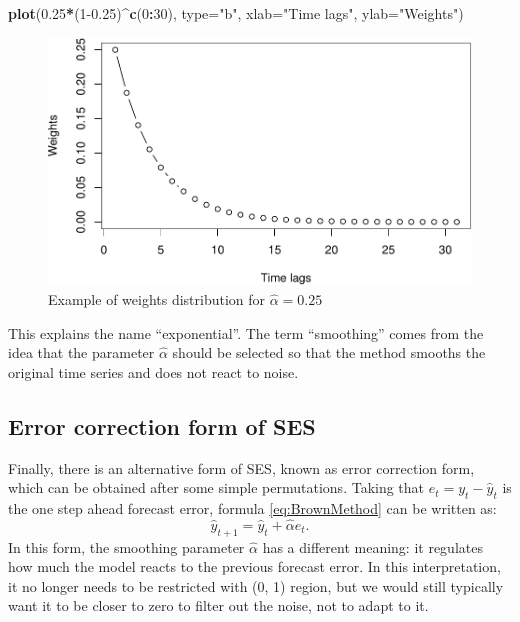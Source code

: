 \documentclass[]{book}
\newenvironment{Shaded}{\begin{snugshade}}{\end{snugshade}}
\newcommand{\DataTypeTok}[1]{\textcolor[rgb]{0.13,0.29,0.53}{#1}}
\newcommand{\DecValTok}[1]{\textcolor[rgb]{0.00,0.00,0.81}{#1}}
\newcommand{\FloatTok}[1]{\textcolor[rgb]{0.00,0.00,0.81}{#1}}
\newcommand{\KeywordTok}[1]{\textcolor[rgb]{0.13,0.29,0.53}{\textbf{#1}}}
\newcommand{\NormalTok}[1]{#1}
\newcommand{\OperatorTok}[1]{\textcolor[rgb]{0.81,0.36,0.00}{\textbf{#1}}}
\newcommand{\StringTok}[1]{\textcolor[rgb]{0.31,0.60,0.02}{#1}}
\theoremstyle{definition}
\theoremstyle{definition}
\theoremstyle{definition}
\theoremstyle{definition}
\theoremstyle{remark}
\begin{document}
\begin{Shaded}
\begin{Highlighting}[]
\KeywordTok{plot}\NormalTok{(}\FloatTok{0.25}\OperatorTok{*}\NormalTok{(}\DecValTok{1}\FloatTok{-0.25}\NormalTok{)}\OperatorTok{^}\KeywordTok{c}\NormalTok{(}\DecValTok{0}\OperatorTok{:}\DecValTok{30}\NormalTok{), }\DataTypeTok{type=}\StringTok{"b"}\NormalTok{, }
     \DataTypeTok{xlab=}\StringTok{"Time lags"}\NormalTok{, }\DataTypeTok{ylab=}\StringTok{"Weights"}\NormalTok{)}
\end{Highlighting}
\end{Shaded}

\begin{figure}
\centering
\includegraphics{Svetunkov--2022----ADAM_files/figure-latex/BrownExponentialExample-1.pdf}
\caption{\label{fig:BrownExponentialExample}Example of weights distribution for \(\hat{\alpha}=0.25\)}
\end{figure}

This explains the name ``exponential''. The term ``smoothing'' comes from the idea that the parameter \(\hat{\alpha}\) should be selected so that the method smooths the original time series and does not react to noise.

\hypertarget{SESEC}{%
\subsection{Error correction form of SES}\label{SESEC}}

Finally, there is an alternative form of SES, known as error correction form, which can be obtained after some simple permutations. Taking that \(e_t=y_t-\hat{y}_t\) is the one step ahead forecast error, formula \eqref{eq:BrownMethod} can be written as:
\begin{equation}
  \hat{y}_{t+1} = \hat{y}_{t} + \hat{\alpha} e_{t}.
  \label{eq:SESErrorCorrection}
\end{equation}
In this form, the smoothing parameter \(\hat{\alpha}\) has a different meaning: it regulates how much the model reacts to the previous forecast error. In this interpretation, it no longer needs to be restricted with (0, 1) region, but we would still typically want it to be closer to zero to filter out the noise, not to adapt to it.
\end{document}
